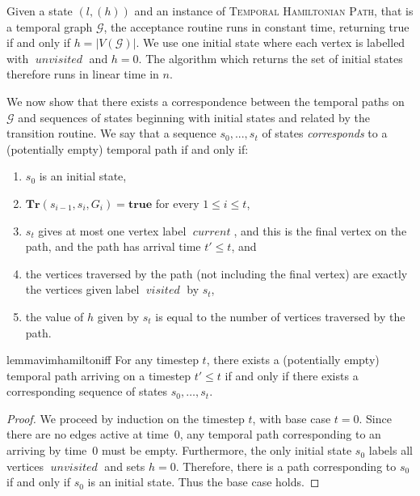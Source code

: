 \documentclass[a4paper,UKenglish,cleveref, autoref, thm-restate]{lipics-v2021} %
\DeclareMathOperator{\visited}{\textit{visited}}
\DeclareMathOperator{\unvisited}{\textit{unvisited}}
\DeclareMathOperator{\current}{\textit{current}}
\begin{document}
\begin{toappendix}

Given a state $(l, (h))$ and an instance of \textsc{Temporal Hamiltonian Path}, that is a temporal graph $\mathcal{G}$, the acceptance routine runs in constant time, returning true if and only if $h = |V(\mathcal{G})|$.
We use one initial state where each vertex is labelled with $\unvisited$ and $h=0$. The algorithm which returns the set of initial states therefore runs in linear time in $n$.

We now show that there exists a correspondence between the temporal paths on $\mathcal{G}$ and sequences of states beginning with initial states and related by the transition routine. We say that a sequence $s_0, ..., s_t$ of states \textit{corresponds} to a (potentially empty) temporal path if and only if:
\begin{enumerate}
    \item $s_0$ is an initial state,
    \item $\textbf{Tr}(s_{i-1}, s_i, G_i)=\textbf{true}$ for every $1 \leq i \leq t$,
    \item $s_t$ gives at most one vertex label $\current$, and this is the final vertex on the path, and the path has arrival time $t' \leq t$, and
    \item the vertices traversed by the path (not including the final vertex) are exactly the vertices given label $\visited$ by $s_t$,
    \item the value of $h$ given by $s_t$ is equal to the number of vertices traversed by the path. 
\end{enumerate}
\begin{restatable}{lemma}{vimhamiltoniff}
    For any timestep $t$, there exists a (potentially empty) temporal path arriving on a timestep $t' \leq t$ if and only if there exists a corresponding sequence of states $s_0, \ldots, s_t$.
\end{restatable}
\begin{proof}
    We proceed by induction on the timestep $t$, with base case $t=0$. Since there are no edges active at time~0, any temporal path corresponding to an arriving by time~0 must be empty. Furthermore, the only initial state $s_0$ labels all vertices $\unvisited$ and sets $h=0$. Therefore, there is a path corresponding to $s_0$ if and only if $s_0$ is an initial state. Thus the base case holds.


\end{proof}
\end{toappendix}
\end{document}
